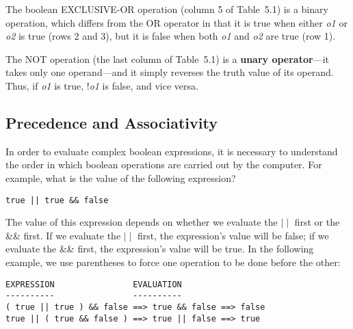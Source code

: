 The boolean EXCLUSIVE-OR operation (column 5 of Table~5.1) is a binary
operation, which differs from the OR operator in that it is true when
either {\it o1} or {\it o2} is true (rows 2 and 3), but it is false
when both {\it o1} and {\it o2} are true (row 1).

The NOT operation (the last column of Table~5.1) is a
{\bf unary operator}---it takes only one operand---and it simply
reverses the truth value of its operand.  Thus, if {\it o1} is true,
!{\it o1} is false, and vice versa.






\subsection{Precedence and Associativity}
\noindent In order to evaluate complex boolean expressions, it is necessary 
to understand the order in which boolean operations are carried out by
the computer.  For example, what is the value of the following
expression?

\begin{jjjlisting}
\begin{lstlisting}
true || true && false
\end{lstlisting}
\end{jjjlisting}

\noindent The value of this expression depends on whether we evaluate
the $\mid\mid$ first or the \&\& first.  If we evaluate the $\mid\mid$
first, the expression's value will be false; if we evaluate the \&\&
first, the expression's value will be true.  In the following example,
we use parentheses to force one operation to be done before the
other:

\begin{jjjlisting}
\begin{lstlisting}
EXPRESSION                EVALUATION
----------                ----------
( true || true ) && false ==> true && false ==> false
true || ( true && false ) ==> true || false ==> true
\end{lstlisting}
\end{jjjlisting}

